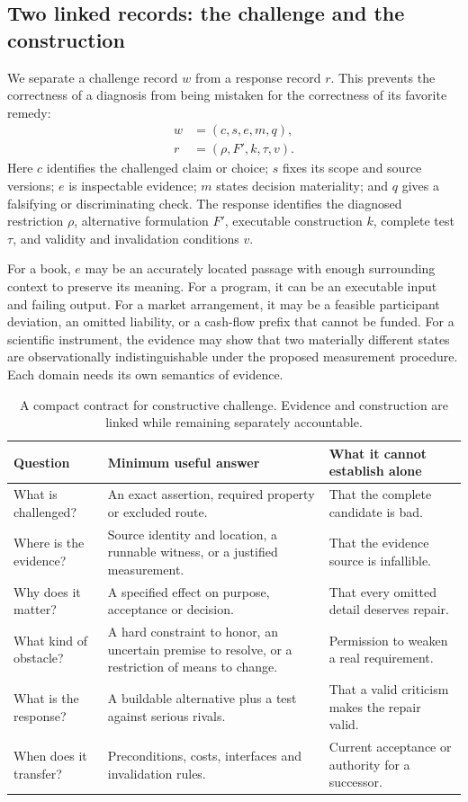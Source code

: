 \subsection{Two linked records: the challenge and the construction}
We separate a challenge record $w$ from a response record $r$. This prevents the correctness of a diagnosis from being mistaken for the correctness of its favorite remedy:
\begin{align}
 w &= (c,s,e,m,q),\\
 r &= (\rho,F',k,\tau,v).
\end{align}
Here $c$ identifies the challenged claim or choice; $s$ fixes its scope and source versions; $e$ is inspectable evidence; $m$ states decision materiality; and $q$ gives a falsifying or discriminating check. The response identifies the diagnosed restriction $\rho$, alternative formulation $F'$, executable construction $k$, complete test $\tau$, and validity and invalidation conditions $v$.

For a book, $e$ may be an accurately located passage with enough surrounding context to preserve its meaning. For a program, it can be an executable input and failing output. For a market arrangement, it may be a feasible participant deviation, an omitted liability, or a cash-flow prefix that cannot be funded. For a scientific instrument, the evidence may show that two materially different states are observationally indistinguishable under the proposed measurement procedure. Each domain needs its own semantics of evidence.

\begin{table}[htbp]
\small
\begin{tabularx}{\textwidth}{P{1.25in}YY}
\toprule
\textbf{Question} & \textbf{Minimum useful answer} & \textbf{What it cannot establish alone}\\
\midrule
What is challenged? & An exact assertion, required property or excluded route. & That the complete candidate is bad.\\
Where is the evidence? & Source identity and location, a runnable witness, or a justified measurement. & That the evidence source is infallible.\\
Why does it matter? & A specified effect on purpose, acceptance or decision. & That every omitted detail deserves repair.\\
What kind of obstacle? & A hard constraint to honor, an uncertain premise to resolve, or a restriction of means to change. & Permission to weaken a real requirement.\\
What is the response? & A buildable alternative plus a test against serious rivals. & That a valid criticism makes the repair valid.\\
When does it transfer? & Preconditions, costs, interfaces and invalidation rules. & Current acceptance or authority for a successor.\\
\bottomrule
\end{tabularx}
\caption{A compact contract for constructive challenge. Evidence and construction are linked while remaining separately accountable.}
\end{table}

